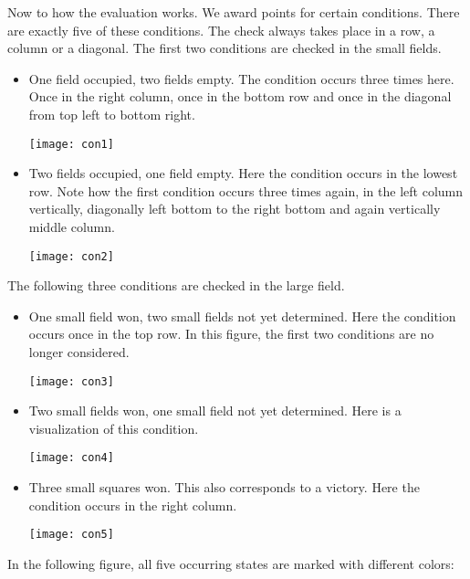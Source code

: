 Now to how the evaluation works. We award points for certain conditions. There are exactly five of these conditions. The check always takes place in a row, a column or a diagonal. The first two conditions are checked in the small fields.
\begin{itemize}
\item One field occupied, two fields empty. The condition occurs three times here. Once in the right column, once in the bottom row and once in the diagonal from top left to bottom right.
\begin{fixedpic}
	\texttt{[image: con1]}
\end{fixedpic}
\item Two fields occupied, one field empty. Here the condition occurs in the lowest row. Note how the first condition occurs three times again, in the left column vertically, diagonally left bottom to the right bottom and again vertically middle column.
\begin{fixedpic}
	\texttt{[image: con2]}
\end{fixedpic}
\end{itemize}
The following three conditions are checked in the large field.
\begin{itemize}
\item One small field won, two small fields not yet determined. Here the condition occurs once in the top row. In this figure, the first two conditions are no longer considered.
\begin{fixedpic}
	\texttt{[image: con3]}
\end{fixedpic}
\item Two small fields won, one small field not yet determined. Here is a visualization of this condition.
\begin{fixedpic}
	\centering
	\texttt{[image: con4]}
\end{fixedpic}
\item Three small squares won. This also corresponds to a victory. Here the condition occurs in the right column.
\begin{fixedpic}
	\centering
	\texttt{[image: con5]}
\end{fixedpic}
\end{itemize}
In the following figure, all five occurring states are marked with different colors:
